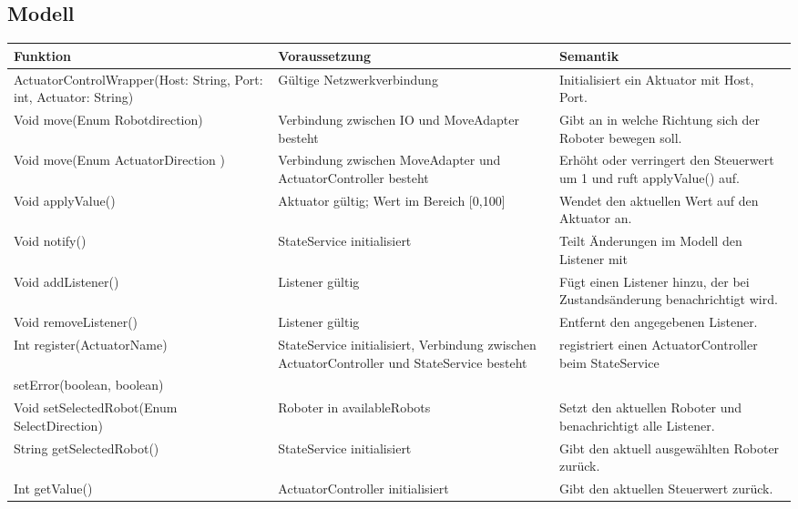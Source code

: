 \subsection{Modell}
\begin{table}[h!]
    \centering
    \begin{tabular}{|p{5cm}|p{5cm}|p{5cm}|}
        \hline
        \textbf{Funktion} & \textbf{Voraussetzung} & \textbf{Semantik} \\
        \hline
        ActuatorControlWrapper(Host: String, Port: int, Actuator: String) & Gültige Netzwerkverbindung & Initialisiert ein Aktuator mit Host, Port. \\
        \hline
        Void move(Enum Robotdirection) & Verbindung zwischen IO und MoveAdapter besteht &  Gibt an in welche Richtung sich der Roboter bewegen soll. \\
        \hline
        Void move(Enum ActuatorDirection ) & Verbindung zwischen MoveAdapter und ActuatorController besteht & Erhöht oder verringert den Steuerwert um 1 und ruft applyValue() auf. \\
        \hline
        Void applyValue() & Aktuator gültig; Wert im Bereich [0,100] & Wendet den aktuellen Wert auf den Aktuator an. \\
		\hline
		Void notify() & StateService initialisiert & Teilt Änderungen im Modell den Listener mit \\
        \hline
        Void addListener() & Listener gültig & Fügt einen Listener hinzu, der bei Zustandsänderung benachrichtigt wird. \\
        \hline
        Void removeListener() & Listener gültig & Entfernt den angegebenen Listener. \\
        \hline
		Int register(ActuatorName) & StateService initialisiert, Verbindung zwischen ActuatorController und StateService besteht& registriert einen ActuatorController beim StateService \\
		\hline
		setError(boolean, boolean)& & \\
		\hline
        Void setSelectedRobot(Enum SelectDirection) & Roboter in availableRobots & Setzt den aktuellen Roboter und benachrichtigt alle Listener. \\
        \hline
        String getSelectedRobot() & StateService initialisiert & Gibt den aktuell ausgewählten Roboter zurück. \\
        \hline
        Int getValue() & ActuatorController initialisiert & Gibt den aktuellen Steuerwert zurück. \\

\end{tabular}
\end{table}
